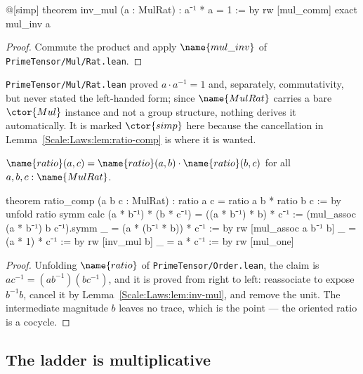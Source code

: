 \begin{leancode}
@[simp] theorem inv_mul (a : MulRat) : a⁻¹ * a = 1 := by
  rw [mul_comm]
  exact mul_inv a
\end{leancode}

\begin{proof}
Commute the product and apply $\name{mul\_inv}$ of
\texttt{PrimeTensor/Mul/Rat.lean}.
\end{proof}

\begin{remark}
\label{Scale:Laws:rem:inv-mul}
\texttt{PrimeTensor/Mul/Rat.lean} proved $a \cdot a^{-1} = 1$ and, separately,
commutativity, but never stated the left-handed form; since $\name{MulRat}$
carries a bare $\ctor{Mul}$ instance and not a group structure, nothing
derives it automatically.  It is marked $\ctor{simp}$ here because the
cancellation in Lemma~\ref{Scale:Laws:lem:ratio-comp} is where it is wanted.
\end{remark}

\begin{lemma}\label{Scale:Laws:lem:ratio-comp}
$\name{ratio}(a,c) = \name{ratio}(a,b) \cdot \name{ratio}(b,c)$ for all
$a,b,c : \name{MulRat}$.
\end{lemma}

\begin{leancode}
theorem ratio_comp (a b c : MulRat) :
    ratio a c = ratio a b * ratio b c := by
  unfold ratio
  symm
  calc
    (a * b⁻¹) * (b * c⁻¹)
        = ((a * b⁻¹) * b) * c⁻¹ := (mul_assoc (a * b⁻¹) b c⁻¹).symm
    _ = (a * (b⁻¹ * b)) * c⁻¹ := by
      rw [mul_assoc a b⁻¹ b]
    _ = (a * 1) * c⁻¹ := by
      rw [inv_mul b]
    _ = a * c⁻¹ := by
      rw [mul_one]
\end{leancode}

\begin{proof}
Unfolding $\name{ratio}$ of \texttt{PrimeTensor/Order.lean}, the claim is
$a c^{-1} = (a b^{-1})(b c^{-1})$, and it is proved from right to left:
reassociate to expose $b^{-1} b$, cancel it by
Lemma~\ref{Scale:Laws:lem:inv-mul}, and remove the unit.  The intermediate
magnitude $b$ leaves no trace, which is the point --- the oriented ratio is a
cocycle.
\end{proof}

\subsection{The ladder is multiplicative}

